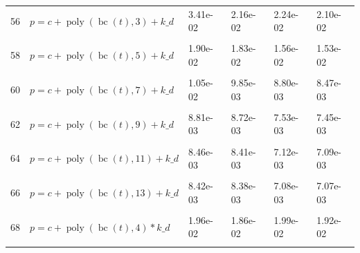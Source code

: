 \documentclass[12pt,a4paper]{article}
\DeclareMathOperator{\bc}{bc}
\DeclareMathOperator{\poly}{poly}
\begin{document}
\begin{longtable}[t]{ll>{\raggedleft\arraybackslash}p{2cm}>{\raggedleft\arraybackslash}p{2cm}>{\raggedleft\arraybackslash}p{2cm}>{\raggedleft\arraybackslash}p{2cm}}
56 & $p = c + \poly\left( \bc(t), 3 \right) + k\_d$ & 3.41e-02 & 2.16e-02 & 2.24e-02 & 2.10e-02\\
\cellcolor{gray!6}{57} & \cellcolor{gray!6}{$p = c + \poly\left( \bc(t), 4 \right) + k\_d$} & \cellcolor{gray!6}{2.17e-02} & \cellcolor{gray!6}{2.06e-02} & \cellcolor{gray!6}{2.14e-02} & \cellcolor{gray!6}{2.07e-02}\\
58 & $p = c + \poly\left( \bc(t), 5 \right) + k\_d$ & 1.90e-02 & 1.83e-02 & 1.56e-02 & 1.53e-02\\
\cellcolor{gray!6}{59} & \cellcolor{gray!6}{$p = c + \poly\left( \bc(t), 6 \right) + k\_d$} & \cellcolor{gray!6}{1.07e-02} & \cellcolor{gray!6}{1.01e-02} & \cellcolor{gray!6}{9.65e-03} & \cellcolor{gray!6}{8.98e-03}\\
60 & $p = c + \poly\left( \bc(t), 7 \right) + k\_d$ & 1.05e-02 & 9.85e-03 & 8.80e-03 & 8.47e-03\\
\cellcolor{gray!6}{61} & \cellcolor{gray!6}{$p = c + \poly\left( \bc(t), 8 \right) + k\_d$} & \cellcolor{gray!6}{9.47e-03} & \cellcolor{gray!6}{9.13e-03} & \cellcolor{gray!6}{7.65e-03} & \cellcolor{gray!6}{7.61e-03}\\
62 & $p = c + \poly\left( \bc(t), 9 \right) + k\_d$ & 8.81e-03 & 8.72e-03 & 7.53e-03 & 7.45e-03\\
\cellcolor{gray!6}{63} & \cellcolor{gray!6}{$p = c + \poly\left( \bc(t), 10 \right) + k\_d$} & \cellcolor{gray!6}{8.54e-03} & \cellcolor{gray!6}{8.49e-03} & \cellcolor{gray!6}{7.15e-03} & \cellcolor{gray!6}{7.12e-03}\\
64 & $p = c + \poly\left( \bc(t), 11 \right) + k\_d$ & 8.46e-03 & 8.41e-03 & 7.12e-03 & 7.09e-03\\
\cellcolor{gray!6}{65} & \cellcolor{gray!6}{$p = c + \poly\left( \bc(t), 12 \right) + k\_d$} & \cellcolor{gray!6}{8.45e-03} & \cellcolor{gray!6}{8.40e-03} & \cellcolor{gray!6}{7.10e-03} & \cellcolor{gray!6}{7.08e-03}\\
66 & $p = c + \poly\left( \bc(t), 13 \right) + k\_d$ & 8.42e-03 & 8.38e-03 & 7.08e-03 & 7.07e-03\\
\cellcolor{gray!6}{67} & \cellcolor{gray!6}{$p = c + \poly\left( \bc(t), 3 \right) * k\_d$} & \cellcolor{gray!6}{3.30e-02} & \cellcolor{gray!6}{2.00e-02} & \cellcolor{gray!6}{2.13e-02} & \cellcolor{gray!6}{1.98e-02}\\
68 & $p = c + \poly\left( \bc(t), 4 \right) * k\_d$ & 1.96e-02 & 1.86e-02 & 1.99e-02 & 1.92e-02\\
\cellcolor{gray!6}{69} & \cellcolor{gray!6}{$p = c + \poly\left( \bc(t), 5 \right) * k\_d$} & \cellcolor{gray!6}{1.67e-02} & \cellcolor{gray!6}{1.61e-02} & \cellcolor{gray!6}{1.37e-02} & \cellcolor{gray!6}{1.34e-02}\\

\end{longtable}
\end{document}
